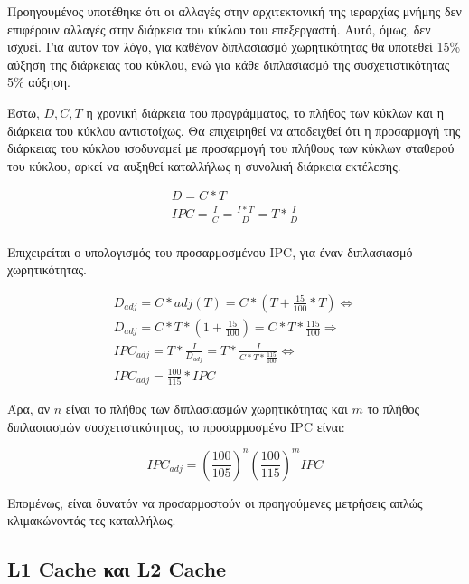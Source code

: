 \documentclass{article}
\newcommand{\eng}[1]{\foreignlanguage{english}{#1}}
\begin{document}
Προηγουμένος υποτέθηκε ότι οι αλλαγές στην αρχιτεκτονική της ιεραρχίας μνήμης δεν επιφέρουν αλλαγές στην διάρκεια του κύκλου του επεξεργαστή. Αυτό, όμως, δεν ισχυεί. Για αυτόν τον λόγο, για καθέναν διπλασιασμό χωρητικότητας θα υποτεθεί 15\% αύξηση της διάρκειας του κύκλου, ενώ για κάθε διπλασιασμό της συσχετιστικότητας 5\% αύξηση.

Έστω, $D, C, T$ η χρονική διάρκεια του προγράμματος, το πλήθος των κύκλων και η διάρκεια του κύκλου αντιστοίχως. Θα επιχειρηθεί να αποδειχθεί ότι η προσαρμογή της διάρκειας του κύκλου ισοδυναμεί με προσαρμογή του πλήθους των κύκλων σταθερού του κύκλου, αρκεί να αυξηθεί καταλλήλως η συνολική διάρκεια εκτέλεσης.

\begin{equation}
    \begin{gathered}
        D = C * T \\
        IPC = \frac{I}{C} = \frac{I * T}{D} = T * \frac{I}{D} \\
    \end{gathered}
\end{equation}

Επιχειρείται ο υπολογισμός του προσαρμοσμένου \eng{IPC}, για έναν διπλασιασμό χωρητικότητας.

\begin{equation}
    \begin{gathered}
        D_{adj} = C * adj(T) = C * ( T + \frac{15}{100} * T) \Leftrightarrow \\
        D_{adj} = C * T * (1 + \frac{15}{100}) = C * T * \frac{115}{100} \Rightarrow \\
        IPC_{adj} = T * \frac{I}{D_{adj}} = T * \frac{I}{ C * T * \frac{115}{100}} \Leftrightarrow \\
        IPC_{adj} = \frac{100}{115} * IPC
    \end{gathered}
\end{equation}

Άρα, αν $n$ είναι το πλήθος των διπλασιασμών χωρητικότητας και $m$ το πλήθος διπλασιασμών συσχετιστικότητας, το προσαρμοσμένο \eng{IPC} είναι:

\begin{equation}
    IPC_{adj} = \left(\frac{100}{105}\right)^{n}\left(\frac{100}{115}\right)^{m} IPC
\end{equation}

Επομένως, είναι δυνατόν να προσαρμοστούν οι προηγούμενες μετρήσεις απλώς κλιμακώνοντάς τες καταλλήλως.

\subsection{\eng{L1 Cache} και \eng{L2 Cache}}
\end{document}
